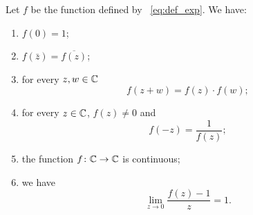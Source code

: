 \begin{theorem}
\label{th:exp_complesso}%
Let $f$ be the function defined by ~\eqref{eq:def_exp}.
We have:
\begin{enumerate}
\item
$\displaystyle f(0) = 1$;

\item
$\displaystyle f(\bar z) = \overline{f(z)}$;

\item
for every $z,w \in {\mathbb C}$
\[
  f(z+w) = f(z) \cdot f(w);
\]

\item
for every $z\in {\mathbb C}$, $f(z) \neq 0$ and
\[
 f(-z) = \frac{1}{f(z)};
\]

\item the function $f\colon {\mathbb C} \to {\mathbb C}$ is continuous;

\item we have
\begin{equation}\label{eq:limite_exp_complesso}
   \lim_{z\to 0}\frac{f(z)-1}{z} = 1.
\end{equation}
\end{enumerate}
\end{theorem}
%
